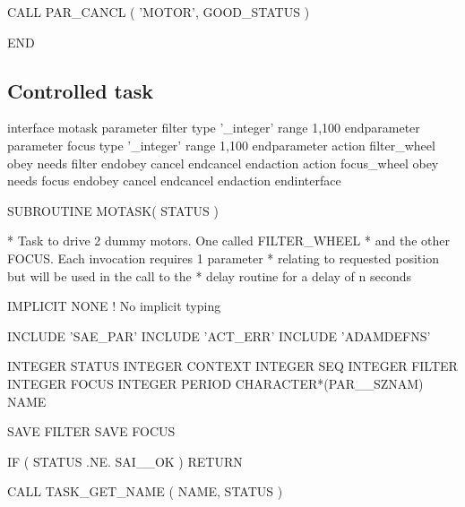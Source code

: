 \documentclass[twoside,11pt,nolof]{starlink}
\begin{document}
\begin{small}
\begin{terminalv}
      CALL PAR_CANCL ( 'MOTOR', GOOD_STATUS )

      END
\end{terminalv}
\end{small}

\subsection{Controlled task}

\begin{small}
\begin{terminalv}
interface motask
   parameter filter
      type '_integer'
      range 1,100
   endparameter
   parameter focus
      type '_integer'
      range 1,100
   endparameter
   action filter_wheel
      obey
         needs filter
      endobey
      cancel
      endcancel
   endaction
   action focus_wheel
      obey
         needs focus
      endobey
      cancel
      endcancel
   endaction
endinterface

      SUBROUTINE MOTASK( STATUS )

*     Task to drive 2 dummy motors. One called FILTER_WHEEL
*     and the other FOCUS. Each invocation requires 1 parameter
*     relating to requested position but will be used in the call to the
*     delay routine for a delay of n seconds

      IMPLICIT NONE              ! No implicit typing

      INCLUDE 'SAE_PAR'
      INCLUDE 'ACT_ERR'
      INCLUDE 'ADAMDEFNS'

      INTEGER STATUS
      INTEGER CONTEXT
      INTEGER SEQ
      INTEGER FILTER
      INTEGER FOCUS
      INTEGER PERIOD
      CHARACTER*(PAR__SZNAM) NAME

      SAVE FILTER
      SAVE FOCUS

      IF ( STATUS .NE. SAI__OK ) RETURN

      CALL TASK_GET_NAME ( NAME, STATUS )


\end{terminalv}
\end{small}
\end{document}
